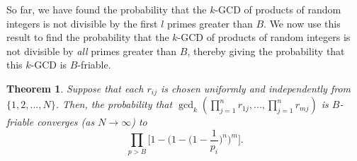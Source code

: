 \documentclass[10pt,a4paper]{article}
\newtheorem{theorem}{Theorem}[section]
\theoremstyle{definition}
\theoremstyle{remark}
\begin{document}
So far, we have found the probability that the $k$-GCD of products of random integers is not divisible by the first \(l\) primes greater than \(B\). We now use this result to find the probability that the $k$-GCD of products of random integers is not divisible by \textit{all} primes greater than $B$, thereby giving the probability that this $k$-GCD is $B$-friable.

\begin{theorem} Suppose that each $r_{ij}$ is chosen uniformly and independently from $\{1, 2, ..., N\}$. Then, the probability that $\gcd_k(\prod_{j=1}^n r_{1j}, ... , \prod_{j=1}^n r_{mj})$ is $B$-friable converges (as $N \to \infty$) to
$$\prod_{p>B} \Big[1 - \Big(1 - \Big(1-\frac{1}{p_i}\Big)^n\Big)^m\Big].$$
\end{theorem}

\end{document}
